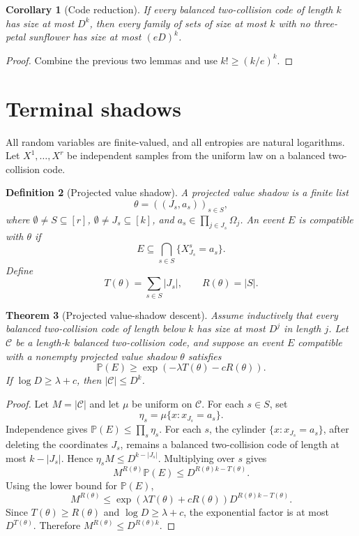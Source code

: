 \documentclass[11pt]{article}
\newtheorem{theorem}{Theorem}[section]
\newtheorem{corollary}[theorem]{Corollary}
\newtheorem{definition}[theorem]{Definition}
\theoremstyle{remark}
\newcommand{\C}{\mathcal C}
\newcommand{\Prob}{\mathbb P}
\begin{document}
\begin{corollary}[Code reduction]\label{cor:code-reduction}
If every balanced two-collision code of length $k$ has size at most $D^k$, then every family of sets of size at most $k$ with no three-petal sunflower has size at most $(eD)^k$.
\end{corollary}

\begin{proof}
Combine the previous two lemmas and use $k!\ge (k/e)^k$.
\end{proof}

\section{Terminal shadows}

All random variables are finite-valued, and all entropies are natural logarithms.  Let $X^1,\ldots,X^r$ be independent samples from the uniform law on a balanced two-collision code.

\begin{definition}[Projected value shadow]
A projected value shadow is a finite list
\[
        \theta=((J_s,a_s))_{s\in S},
\]
where $\emptyset\ne S\subseteq [r]$, $\emptyset\ne J_s\subseteq [k]$, and $a_s\in\prod_{j\in J_s}\Omega_j$.  An event $E$ is compatible with $\theta$ if
\[
        E\subseteq \bigcap_{s\in S}\{X^s_{J_s}=a_s\}.
\]
Define
\[
        T(\theta)=\sum_{s\in S}|J_s|,\qquad R(\theta)=|S|.
\]
\end{definition}

\begin{theorem}[Projected value-shadow descent]\label{thm:value-shadow}
Assume inductively that every balanced two-collision code of length below $k$ has size at most $D^j$ in length $j$.  Let $\C$ be a length-$k$ balanced two-collision code, and suppose an event $E$ compatible with a nonempty projected value shadow $\theta$ satisfies
\[
        \Prob(E)\ge \exp(-\lambda T(\theta)-cR(\theta)).
\]
If $\log D\ge \lambda+c$, then $|\C|\le D^k$.
\end{theorem}

\begin{proof}
Let $M=|\C|$ and let $\mu$ be uniform on $\C$.  For each $s\in S$, set
\[
        \eta_s=\mu\{x:x_{J_s}=a_s\}.
\]
Independence gives $\Prob(E)\le\prod_s\eta_s$.  For each $s$, the cylinder $\{x:x_{J_s}=a_s\}$, after deleting the coordinates $J_s$, remains a balanced two-collision code of length at most $k-|J_s|$.  Hence $\eta_s M\le D^{k-|J_s|}$.  Multiplying over $s$ gives
\[
        M^{R(\theta)}\Prob(E)\le D^{R(\theta)k-T(\theta)}.
\]
Using the lower bound for $\Prob(E)$,
\[
        M^{R(\theta)}\le \exp(\lambda T(\theta)+cR(\theta))D^{R(\theta)k-T(\theta)}.
\]
Since $T(\theta)\ge R(\theta)$ and $\log D\ge \lambda+c$, the exponential factor is at most $D^{T(\theta)}$.  Therefore $M^{R(\theta)}\le D^{R(\theta)k}$.
\end{proof}
\end{document}
